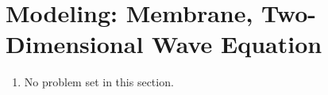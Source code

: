 \section{Modeling: Membrane, Two-Dimensional Wave Equation}

\begin{enumerate}
    \item No problem set in this section.
\end{enumerate}